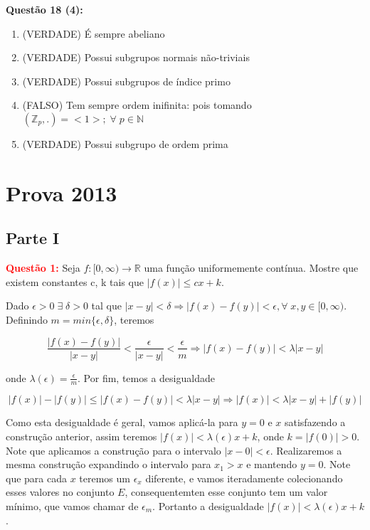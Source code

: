 \documentclass{article}
\begin{document}
\textbf{Questão 18 (4):}
\begin{enumerate}
	\item (VERDADE) É sempre abeliano
	
	\item (VERDADE) Possui subgrupos normais não-triviais 
	
	\item (VERDADE) Possui subgrupos de índice primo
	
	\item (FALSO) Tem sempre ordem inifinita: pois tomando $(\mathbb{Z}_p, .) = <1>; \; \forall \; p \in \mathbb{N}$
	
	\item (VERDADE) Possui subgrupo de ordem prima
\end{enumerate}

\section{Prova 2013}
\subsection{Parte I}
\textcolor{red}{\textbf{Questão 1:}} Seja $f: [0,\infty) \to \mathbb R$ uma
função uniformemente contínua. Mostre que existem constantes c, k tais que $|f(x)| \leq cx+k$.

Dado $\epsilon >0 \; \exists \; \delta>0$ tal que $|x-y| < \delta \Rightarrow
|f(x)-f(y)| < \epsilon, \forall \; x, y \in [0,\infty) $. Definindo $m =
min\{\epsilon, \delta\}$, teremos 

$$\frac{|f(x)-f(y)|}{|x-y|} < \frac{\epsilon}{|x-y|} < \frac{\epsilon}{m}
\Rightarrow |f(x)-f(y)| < \lambda |x-y|$$

onde $\lambda(\epsilon) = \frac{\epsilon}{m}$. Por fim, temos a
desigualdade 


$$|f(x)|-|f(y)| \leq |f(x)-f(y)| < \lambda |x-y|\Rightarrow |f(x)| <
\lambda |x-y| + |f(y)|$$

Como esta desigualdade é geral, vamos aplicá-la para $y=0$ e $x$ satisfazendo
a construção anterior, assim teremos $|f(x)| < \lambda(\epsilon) x + k$, onde
$k=|f(0)|>0$. Note que aplicamos a construção para o intervalo $|x - 0| <
\epsilon$. Realizaremos a mesma construção expandindo o intervalo para $x_1 > x$
e mantendo $y=0$. Note que para cada $x$ teremos um $\epsilon_x$ diferente, e
vamos iteradamente colecionando esses valores no conjunto $E$,
consequentemten esse conjunto tem um valor mínimo, que vamos chamar de
$\epsilon_m$. Portanto a desigualdade $|f(x)| < \lambda(\epsilon) x +
k$.
\end{document}
